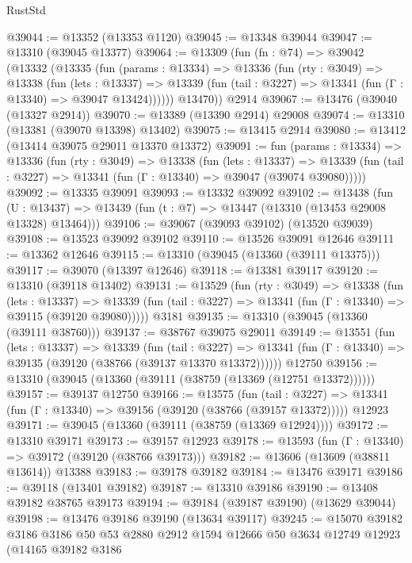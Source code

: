 \begin{lexlean}{RustStd}
\begin{coremodule}
@39044 := @13352 (@13353 @1120)
@39045 := @13348 @39044
@39047 := @13310 (@39045 @13377)
@39064 := @13309
    (fun (fn : @74) =>
    @39042
      (@13332
        (@13335
          (fun (params : @13334) =>
          @13336
            (fun (rty : @3049) =>
            @13338
              (fun (lets : @13337) =>
              @13339 (fun (tail : @3227) => @13341 (fun (Γ : @13340) => @39047 @13424))))))
        @13470))
    @2914
@39067 := @13476 (@39040 (@13327 @2914))
@39070 := @13389 (@13390 @2914) @29008
@39074 := @13310 (@13381 (@39070 @13398) @13402)
@39075 := @13415 @2914
@39080 := @13412 (@13414 @39075 @29011 @13370 @13372)
@39091 := fun (params : @13334) =>
  @13336
    (fun (rty : @3049) =>
    @13338
      (fun (lets : @13337) =>
      @13339 (fun (tail : @3227) => @13341 (fun (Γ : @13340) => @39047 (@39074 @39080)))))
@39092 := @13335 @39091
@39093 := @13332 @39092
@39102 := @13438
    (fun (U : @13437) => @13439 (fun (t : @7) => @13447 (@13310 (@13453 @29008 @13328) @13464)))
@39106 := @39067 (@39093 @39102) (@13520 @39039)
@39108 := @13523 @39092 @39102
@39110 := @13526 @39091 @12646
@39111 := @13362 @12646
@39115 := @13310 (@39045 (@13360 (@39111 @13375)))
@39117 := @39070 (@13397 @12646)
@39118 := @13381 @39117
@39120 := @13310 (@39118 @13402)
@39131 := @13529
    (fun (rty : @3049) =>
    @13338
      (fun (lets : @13337) =>
      @13339 (fun (tail : @3227) => @13341 (fun (Γ : @13340) => @39115 (@39120 @39080)))))
    @3181
@39135 := @13310 (@39045 (@13360 (@39111 @38760)))
@39137 := @38767 @39075 @29011
@39149 := @13551
    (fun (lets : @13337) =>
    @13339
      (fun (tail : @3227) =>
      @13341 (fun (Γ : @13340) => @39135 (@39120 (@38766 (@39137 @13370 @13372))))))
    @12750
@39156 := @13310 (@39045 (@13360 (@39111 (@38759 (@13369 (@12751 @13372))))))
@39157 := @39137 @12750
@39166 := @13575
    (fun (tail : @3227) => @13341 (fun (Γ : @13340) => @39156 (@39120 (@38766 (@39157 @13372)))))
    @12923
@39171 := @39045 (@13360 (@39111 (@38759 (@13369 @12924))))
@39172 := @13310 @39171
@39173 := @39157 @12923
@39178 := @13593 (fun (Γ : @13340) => @39172 (@39120 (@38766 @39173)))
@39182 := @13606 (@13609 (@38811 @13614)) @13388
@39183 := @39178 @39182
@39184 := @13476 @39171
@39186 := @39118 (@13401 @39182)
@39187 := @13310 @39186
@39190 := @13408 @39182 @38765 @39173
@39194 := @39184 (@39187 @39190) (@13629 @39044)
@39198 := @13476 @39186 @39190 (@13634 @39117)
@39245 := @15070
    @39182
    @3186
    @3186
    @50
    @53
    @2880
    @2912
    @1594
    @12666
    @50
    @3634
    @12749
    @12923
    (@14165
      @39182
      @3186

\end{coremodule}
\end{lexlean}
